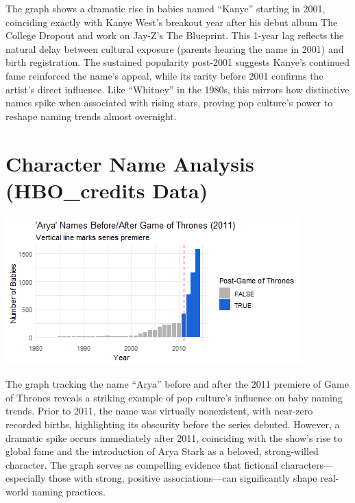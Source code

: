 \documentclass[11pt,preprint]{elsarticle}
\let\origfigure\figure
\let\endorigfigure\endfigure
\renewenvironment{figure}[1][2] {
    \expandafter\origfigure\expandafter[H]
} {
    \endorigfigure
}
\numberwithin{equation}{section}
\numberwithin{figure}{section}
\numberwithin{table}{section}
\begin{document}
The graph shows a dramatic rise in babies named ``Kanye'' starting in
2001, coinciding exactly with Kanye West's breakout year after his debut
album The College Dropout and work on Jay-Z's The Blueprint. This 1-year
lag reflects the natural delay between cultural exposure (parents
hearing the name in 2001) and birth registration. The sustained
popularity post-2001 suggests Kanye's continued fame reinforced the
name's appeal, while its rarity before 2001 confirms the artist's direct
influence. Like ``Whitney'' in the 1980s, this mirrors how distinctive
names spike when associated with rising stars, proving pop culture's
power to reshape naming trends almost overnight.

\section{Character Name Analysis (HBO\_credits
Data)}\label{character-name-analysis-hbo_credits-data}

\begin{figure}[H]

{\centering \includegraphics{23034103_Q1USbabynames_files/figure-latex/Figure 4a-1} 

}

\caption{Caption Here \label{Figure1}}\label{fig:Figure 4a}
\end{figure}

The graph tracking the name ``Arya'' before and after the 2011 premiere
of Game of Thrones reveals a striking example of pop culture's influence
on baby naming trends. Prior to 2011, the name was virtually
nonexistent, with near-zero recorded births, highlighting its obscurity
before the series debuted. However, a dramatic spike occurs immediately
after 2011, coinciding with the show's rise to global fame and the
introduction of Arya Stark as a beloved, strong-willed character. The
graph serves as compelling evidence that fictional
characters---especially those with strong, positive associations---can
significantly shape real-world naming practices.
\end{document}
